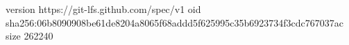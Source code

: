 version https://git-lfs.github.com/spec/v1
oid sha256:06b8090908be61de8204a8065f68addd5f625995c35b6923734f3cdc767037ac
size 262240
